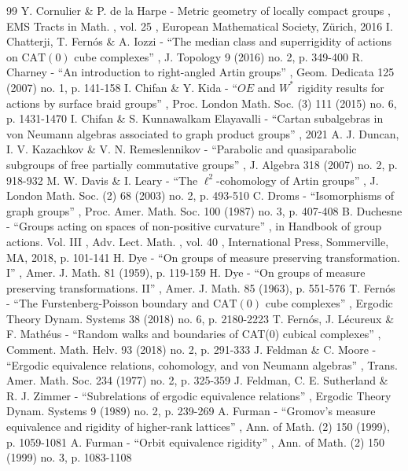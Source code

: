 \documentclass[11pt]{article}
\numberwithin{equation}{section}
\theoremstyle{plain}
\theoremstyle{definition}
\begin{document}
\begin{thebibliography}{99}
 Y. Cornulier \& P. de la Harpe - Metric geometry of locally compact groups , EMS Tracts in Math. , vol. 25 , European Mathematical Society, Zürich, 2016
 I. Chatterji, T. Fernós \& A. Iozzi - “The median class and superrigidity of actions on $\mathrm{CAT}(0)$ cube complexes” , J. Topology 9 (2016) no. 2, p. 349-400
 R. Charney - “An introduction to right-angled Artin groups” , Geom. Dedicata 125 (2007) no. 1, p. 141-158
 I. Chifan \& Y. Kida - “$OE$ and $W^*$ rigidity results for actions by surface braid groups” , Proc. London Math. Soc. (3) 111 (2015) no. 6, p. 1431-1470
 I. Chifan \& S. Kunnawalkam Elayavalli - “Cartan subalgebras in von Neumann algebras associated to graph product groups” , 2021
 A. J. Duncan, I. V. Kazachkov \& V. N. Remeslennikov - “Parabolic and quasiparabolic subgroups of free partially commutative groups” , J. Algebra 318 (2007) no. 2, p. 918-932
 M. W. Davis \& I. Leary - “The $\ell ^2$-cohomology of Artin groups” , J. London Math. Soc. (2) 68 (2003) no. 2, p. 493-510
 C. Droms - “Isomorphisms of graph groups” , Proc. Amer. Math. Soc. 100 (1987) no. 3, p. 407-408
 B. Duchesne - “Groups acting on spaces of non-positive curvature” , in Handbook of group actions. Vol. III , Adv. Lect. Math. , vol. 40 , International Press, Sommerville, MA, 2018, p. 101-141
 H. Dye - “On groups of measure preserving transformation. I” , Amer. J. Math. 81 (1959), p. 119-159
 H. Dye - “On groups of measure preserving transformations. II” , Amer. J. Math. 85 (1963), p. 551-576
 T. Fernós - “The Furstenberg-Poisson boundary and $\mathrm{CAT}(0)$ cube complexes” , Ergodic Theory Dynam. Systems 38 (2018) no. 6, p. 2180-2223
 T. Fernós, J. Lécureux \& F. Mathéus - “Random walks and boundaries of CAT($0$) cubical complexes” , Comment. Math. Helv. 93 (2018) no. 2, p. 291-333
 J. Feldman \& C. Moore - “Ergodic equivalence relations, cohomology, and von Neumann algebras” , Trans. Amer. Math. Soc. 234 (1977) no. 2, p. 325-359
 J. Feldman, C. E. Sutherland \& R. J. Zimmer - “Subrelations of ergodic equivalence relations” , Ergodic Theory Dynam. Systems 9 (1989) no. 2, p. 239-269
 A. Furman - “Gromov’s measure equivalence and rigidity of higher-rank lattices” , Ann. of Math. (2) 150 (1999), p. 1059-1081
 A. Furman - “Orbit equivalence rigidity” , Ann. of Math. (2) 150 (1999) no. 3, p. 1083-1108

\end{thebibliography}
\end{document}
